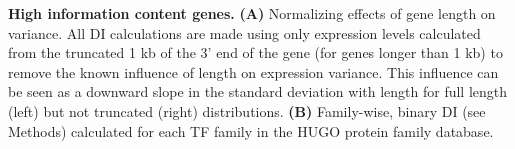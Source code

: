\textbf{High information content genes.}
\textbf {(A)} Normalizing effects of gene length on variance. All DI calculations are made using only expression levels calculated from the truncated 1 kb of the 3' end of the gene (for genes longer than 1 kb) to remove the known influence of length on expression variance. This influence can be seen as a downward slope in the standard deviation with length for full length (left) but not truncated (right) distributions.
\textbf{(B)} Family-wise, binary DI (see Methods) calculated for each TF family in the HUGO protein family database. 